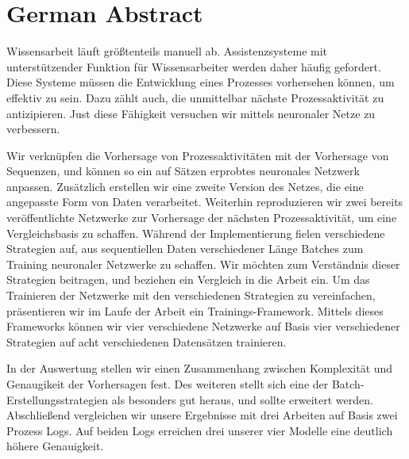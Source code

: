 \chapter*{German Abstract}
Wissensarbeit läuft größtenteils manuell ab.
Assistenzsysteme mit unterstützender Funktion für Wissensarbeiter werden daher häufig gefordert.
Diese Systeme müssen die Entwicklung eines Prozesses vorhersehen können, um effektiv zu sein.
Dazu zählt auch, die unmittelbar nächste Prozessaktivität zu antizipieren.
Just diese Fähigkeit versuchen wir mittels neuronaler Netze zu verbessern.

Wir verknüpfen die Vorhersage von Prozessaktivitäten mit der Vorhersage von Sequenzen, und können so ein auf Sätzen erprobtes neuronales Netzwerk anpassen.
Zusätzlich erstellen wir eine zweite Version des Netzes, die eine angepasste Form von Daten verarbeitet.
Weiterhin reproduzieren wir zwei bereits veröffentlichte Netzwerke zur Vorhersage der nächsten Prozessaktivität, um eine Vergleichsbasis zu schaffen.
Während der Implementierung fielen verschiedene Strategien auf, aus sequentiellen Daten verschiedener Länge Batches zum Training neuronaler Netzwerke zu schaffen.
Wir möchten zum Verständnis dieser Strategien beitragen, und beziehen ein Vergleich in die Arbeit ein.
Um das Trainieren der Netzwerke mit den verschiedenen Strategien zu vereinfachen, präsentieren wir im Laufe der Arbeit ein Trainings-Framework.
Mittels dieses Frameworks können wir vier verschiedene Netzwerke auf Basis vier verschiedener Strategien auf acht verschiedenen Datensätzen trainieren.

In der Auswertung stellen wir einen Zusammenhang zwischen Komplexität und Genaugikeit der Vorhersagen fest.
Des weiteren stellt sich eine der Batch-Erstellungsstrategien als besonders gut heraus, und sollte erweitert werden.
Abschließend vergleichen wir unsere Ergebnisse mit drei Arbeiten auf Basis zwei Prozess Logs.
Auf beiden Logs erreichen drei unserer vier Modelle eine deutlich höhere Genauigkeit.

\endgroup

\vfill
